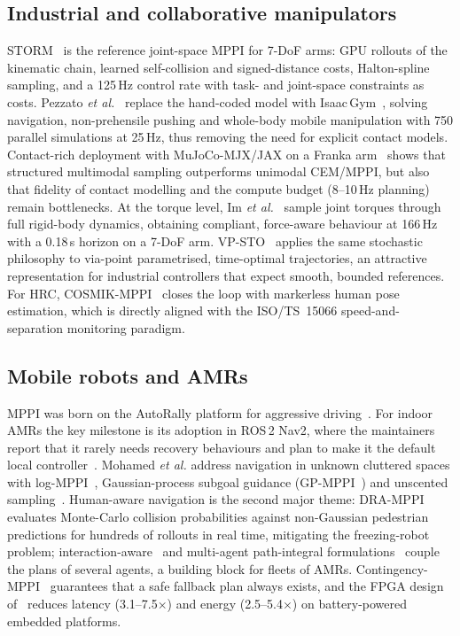 \subsection{Industrial and collaborative manipulators}
STORM~\cite{bhardwaj2021storm} is the reference joint-space MPPI for 7-DoF arms: GPU rollouts of the kinematic chain, learned self-collision and signed-distance costs, Halton-spline sampling, and a 125\,Hz control rate with task- and joint-space constraints as costs. Pezzato \emph{et al.}~\cite{pezzato2025isaacmppi} replace the hand-coded model with Isaac\,Gym~\cite{makoviychuk2021isaacgym}, solving navigation, non-prehensile pushing and whole-body mobile manipulation with 750 parallel simulations at 25\,Hz, thus removing the need for explicit contact models. Contact-rich deployment with MuJoCo-MJX/JAX on a Franka arm~\cite{dierking2026parallelsbmpc} shows that structured multimodal sampling outperforms unimodal CEM/MPPI, but also that fidelity of contact modelling and the compute budget (8--10\,Hz planning) remain bottlenecks. At the torque level, Im \emph{et al.}~\cite{im2026torquemppi} sample joint torques through full rigid-body dynamics, obtaining compliant, force-aware behaviour at 166\,Hz with a 0.18\,s horizon on a 7-DoF arm. VP-STO~\cite{jankowski2023vpsto} applies the same stochastic philosophy to via-point parametrised, time-optimal trajectories, an attractive representation for industrial controllers that expect smooth, bounded references. For HRC, COSMIK-MPPI~\cite{gursoy2026cosmik} closes the loop with markerless human pose estimation, which is directly aligned with the ISO/TS~15066 speed-and-separation monitoring paradigm.

\subsection{Mobile robots and AMRs}
MPPI was born on the AutoRally platform for aggressive driving~\cite{williams2016aggressive,williams2018tro}. For indoor AMRs the key milestone is its adoption in ROS\,2 Nav2, where the maintainers report that it rarely needs recovery behaviours and plan to make it the default local controller~\cite{macenski2023nav2survey}. Mohamed \emph{et al.} address navigation in unknown cluttered spaces with log-MPPI~\cite{mohamed2022logmppi}, Gaussian-process subgoal guidance (GP-MPPI~\cite{mohamed2023gpmppi}) and unscented sampling~\cite{mohamed2025umppi}. Human-aware navigation is the second major theme: DRA-MPPI~\cite{trevisan2025drampi} evaluates Monte-Carlo collision probabilities against non-Gaussian pedestrian predictions for hundreds of rollouts in real time, mitigating the freezing-robot problem; interaction-aware~\cite{jansma2023interaction} and multi-agent path-integral formulations~\cite{streichenberg2023mapi} couple the plans of several agents, a building block for fleets of AMRs. Contingency-MPPI~\cite{jung2024contingency} guarantees that a safe fallback plan always exists, and the FPGA design of~\cite{desai2026fpgampi} reduces latency (3.1--7.5$\times$) and energy (2.5--5.4$\times$) on battery-powered embedded platforms.

